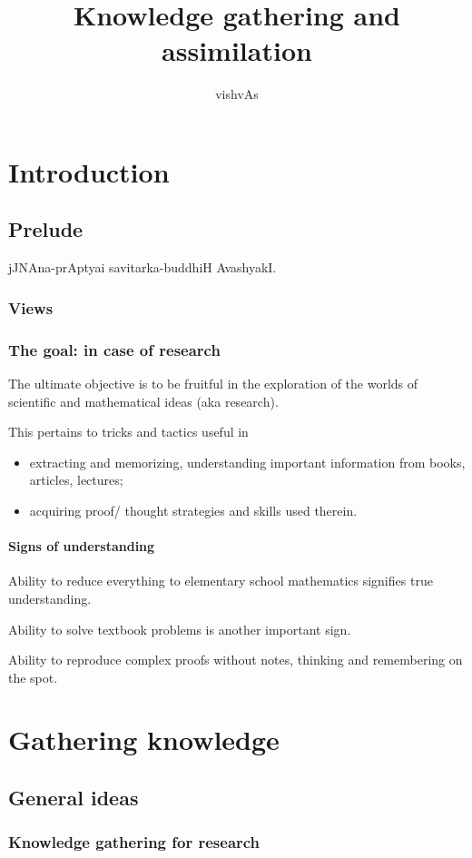 \documentclass[oneside, article]{memoir}
\title{Knowledge gathering and assimilation}
\author{vishvAs}
\begin{document}
\maketitle
\tableofcontents

\part{Introduction}
\chapter{Prelude}
jJNAna-prAptyai savitarka-buddhiH AvashyakI.

\section{Views}
\section{The goal: in case of research}
The ultimate objective is to be fruitful in the exploration of the worlds of scientific and mathematical ideas (aka research).

This pertains to tricks and tactics useful in
\begin{itemize}
 \item extracting and memorizing, understanding important information from books, articles, lectures;
 \item acquiring proof/ thought strategies and skills used therein.
\end{itemize}

\subsection{Signs of understanding}
Ability to reduce everything to elementary school mathematics signifies true understanding.

Ability to solve textbook problems is another important sign.

Ability to reproduce complex proofs without notes, thinking and remembering on the spot.

\part{Gathering knowledge}
\chapter{General ideas}
\section{Knowledge gathering for research}
\end{document}
